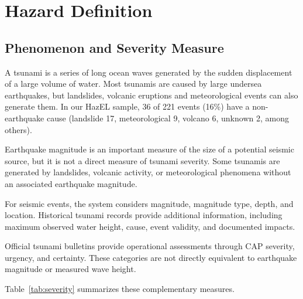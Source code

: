 \documentclass[a4paper,11pt,oneside]{book}
\begin{document}
\section{Hazard Definition}
\label{sec:hazard}

\subsection{Phenomenon and Severity Measure}
\label{sec:severity}
A tsunami is a series of long ocean waves generated by the sudden displacement of a large volume of water.
Most tsunamis are caused by large undersea earthquakes, but landslides, volcanic eruptions and meteorological events can also generate them.
In our HazEL sample, 36 of 221 events (16\%) have a non-earthquake cause (landslide 17, meteorological 9, volcano 6, unknown 2, among others).

Earthquake magnitude is an important measure of the size of a
potential seismic source, but it is not a direct measure of
tsunami severity. Some tsunamis are generated by landslides,
volcanic activity, or meteorological phenomena without an
associated earthquake magnitude.

For seismic events, the system considers magnitude, magnitude
type, depth, and location. Historical tsunami records provide
additional information, including maximum observed water height,
cause, event validity, and documented impacts.

Official tsunami bulletins provide operational assessments through
CAP severity, urgency, and certainty. These categories are not
directly equivalent to earthquake magnitude or measured wave height.

Table~\ref{tab:severity} summarizes these complementary measures.
\end{document}
